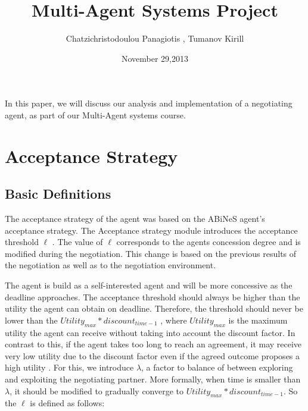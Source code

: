 \documentclass[html]{report}    %
\title{Multi-Agent Systems Project}  %
\author{Chatzichristodoulou Panagiotis , Tumanov Kirill}    %
\date{November 29,2013}   %
\begin{document}

\maketitle                 %

In this paper, we will discuss our analysis and implementation of a negotiating agent, as part of our Multi-Agent systems course.
\section{Acceptance Strategy}  %
\subsection{Basic Definitions}                        
The acceptance strategy of the agent was based on the ABiNeS agent's ~\cite{abines} acceptance strategy.
The Acceptance strategy module introduces the acceptance threshold $\ell$ . The value of $\ell$ corresponds to the agents concession degree and is modified during the negotiation.  This change is based on the previous results of the negotiation as well as to the negotiation environment.


The agent is build as a self-interested agent and will be more concessive as the deadline approaches.
The acceptance threshold should always be higher than the utility the agent can obtain on deadline. Therefore, the threshold should never be lower than the  \( Utility_{max} * discount_{time-1}  \) , where \( Utility_{max} \)  is the maximum utility the agent can receive without taking into account the discount factor. In contrast to this, if the agent takes too long to reach an agreement, it may receive very low utility due to the discount factor even if the agreed outcome proposes a high utility . For this, we introduce $\lambda$, a factor to balance of between exploring and exploiting the negotiating partner.
More formally, when time is smaller than $\lambda$, it should be modified to gradually converge to \( Utility_{max} * discount_{time-1}  \). So the $\ell$ is defined as follows:
\end{document}
